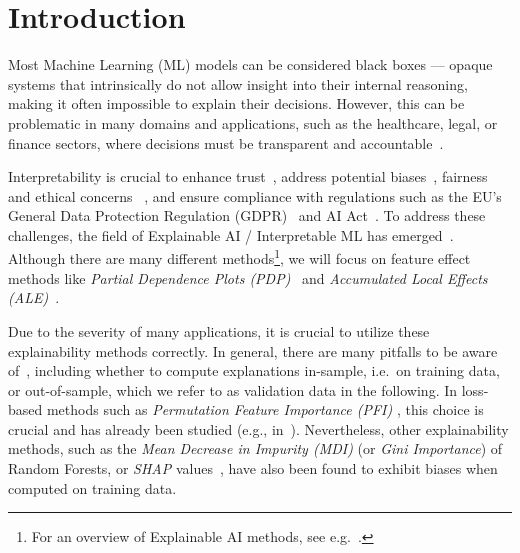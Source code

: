 \documentclass[runningheads]{llncs}
\begin{document}
\section{Introduction}
Most Machine Learning (ML) models can be considered black boxes --- opaque
systems that intrinsically do not allow insight into their internal reasoning,
making it often impossible to explain their decisions. However, this can be
problematic in many domains and applications, such as the healthcare, legal, or
finance sectors, where decisions must be transparent and
accountable~\cite{adadi_peeking_2018}.

Interpretability is crucial to enhance
trust~\cite{ribeiro_why_2016,teach_analysis_1981}, address potential
biases~\cite{guidotti_survey_2019}, fairness and ethical concerns
~\cite{lipton_mythos_2018}, and ensure compliance with regulations such as the
EU's General Data Protection Regulation (GDPR)~\cite{gdpr2016} and AI
Act~\cite{euaia2024}. To address these challenges, the field of Explainable AI
/ Interpretable ML has emerged~\cite{adadi_peeking_2018}. Although there are
many different methods\footnote{For an overview of Explainable AI methods, see
    e.g.~\cite{adadi_peeking_2018,kamath_introduction_2021,molnar_interpretable_2022}.},
we will focus on feature effect methods like \textit{Partial Dependence Plots
    (PDP)}~\cite{friedman_greedy_2001} and \textit{Accumulated Local Effects
    (ALE)}~\cite{apley_visualizing_2020}.

Due to the severity of many applications, it is crucial to utilize these
explainability methods correctly. In general, there are many pitfalls to be
aware of~\cite{molnar_general_2022}, including whether to compute explanations
in-sample, i.e.\ on training data, or out-of-sample, which we refer to as
validation data in the following. In loss-based methods such as
\textit{Permutation Feature Importance (PFI)
}\cite{breiman_random_2001,fisher_all_2019}, this choice is crucial and has
already been studied (e.g., in~\cite{molnar_general_2022}). Nevertheless, other
explainability methods, such as the \textit{Mean Decrease in Impurity (MDI)}
(or \textit{Gini Importance}) of Random Forests, or \textit{SHAP}
values~\cite{loecher_debiasing_2022,loecher_debiasing_2024}, have also been
found to exhibit biases when computed on training data.
\end{document}
